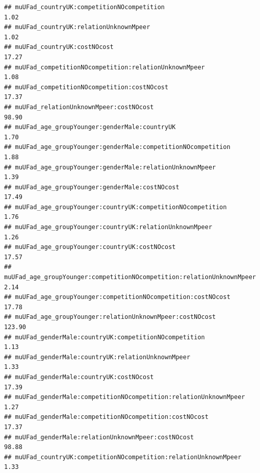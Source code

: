 \documentclass[
]{article}
\begin{document}
\begin{verbatim}
## muUFad_countryUK:competitionNOcompetition                                                                   1.02
## muUFad_countryUK:relationUnknownMpeer                                                                       1.02
## muUFad_countryUK:costNOcost                                                                                17.27
## muUFad_competitionNOcompetition:relationUnknownMpeer                                                        1.08
## muUFad_competitionNOcompetition:costNOcost                                                                 17.37
## muUFad_relationUnknownMpeer:costNOcost                                                                     98.90
## muUFad_age_groupYounger:genderMale:countryUK                                                                1.70
## muUFad_age_groupYounger:genderMale:competitionNOcompetition                                                 1.88
## muUFad_age_groupYounger:genderMale:relationUnknownMpeer                                                     1.39
## muUFad_age_groupYounger:genderMale:costNOcost                                                              17.49
## muUFad_age_groupYounger:countryUK:competitionNOcompetition                                                  1.76
## muUFad_age_groupYounger:countryUK:relationUnknownMpeer                                                      1.26
## muUFad_age_groupYounger:countryUK:costNOcost                                                               17.57
## muUFad_age_groupYounger:competitionNOcompetition:relationUnknownMpeer                                       2.14
## muUFad_age_groupYounger:competitionNOcompetition:costNOcost                                                17.78
## muUFad_age_groupYounger:relationUnknownMpeer:costNOcost                                                   123.90
## muUFad_genderMale:countryUK:competitionNOcompetition                                                        1.13
## muUFad_genderMale:countryUK:relationUnknownMpeer                                                            1.33
## muUFad_genderMale:countryUK:costNOcost                                                                     17.39
## muUFad_genderMale:competitionNOcompetition:relationUnknownMpeer                                             1.27
## muUFad_genderMale:competitionNOcompetition:costNOcost                                                      17.37
## muUFad_genderMale:relationUnknownMpeer:costNOcost                                                          98.88
## muUFad_countryUK:competitionNOcompetition:relationUnknownMpeer                                              1.33

\end{verbatim}
\end{document}
